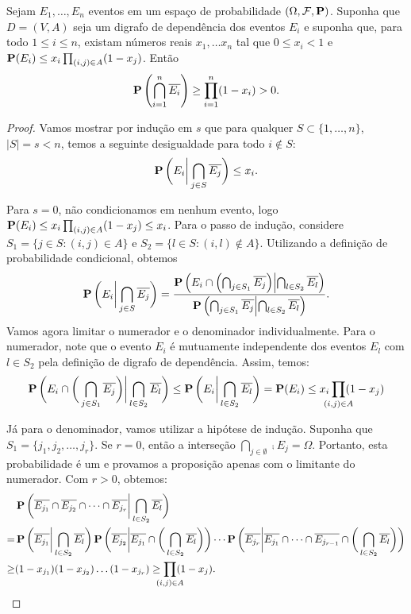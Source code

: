 \begin{lemma}
\label{thm:prob:lll}
Sejam $E_1, \dots, E_n$ eventos em um espaço de probabilidade $(\Omega, \mathcal{F}, \operatorname{\mathbf{P}})$. Suponha que $D = (V, A)$ seja um digrafo de dependência dos eventos $E_i$ e suponha que, para todo $1 \leq i \leq n$, existam números reais $x_1, \dotsc x_n$ tal que $0 \leq x_i < 1$ e $\operatorname{\mathbf{P}} (E_i) \leq x_i \prod_{(i,j) \in A}(1-x_j)$. Então
\[ \operatorname{\mathbf{P}} \left( \bigcap_{i = 1}^n \overline{E_i} \right) \geq \prod_{i = 1}^n (1 - x_i) > 0.\]
\end{lemma}
\begin{proof}
Vamos mostrar por indução em $s$ que para qualquer $S \subset \{1, \dots, n\}$, $|S| = s < n$, temos a seguinte desigualdade para todo $i \not\in S$:
\[ \operatorname{\mathbf{P}}\bigg( E_i \bigg| \bigcap_{j \in S} \overline{E_j} \bigg) \leq x_i.\]

Para $s = 0$, não condicionamos em nenhum evento, logo $\operatorname{\mathbf{P}}(E_i) \leq x_i \prod_{(i,j) \in A}(1-x_j) \leq x_i$. Para o passo de indução, considere $S_1 = \{ j \in S : (i,j) \in A\}$ e $S_2 = \{ l \in S : (i,l) \not\in A \}$. Utilizando a definição de probabilidade condicional, obtemos
\begin{align*}
  \operatorname{\mathbf{P}}\bigg( E_i \bigg| \bigcap_{j \in S} \overline{E_j} \bigg) = \frac{\operatorname{\mathbf{P}}\left( E_i \cap \left(\bigcap_{j \in S_1} \overline{E_j} \right) \middle| \bigcap_{l \in S_2} \overline{E_l} \right)}{\operatorname{\mathbf{P}}\left( \bigcap_{j \in S_1} \overline{E_j} \middle| \bigcap_{l \in S_2} \overline{E_l} \right)}.
\end{align*}
Vamos agora limitar o numerador e o denominador individualmente. Para o numerador, note que o evento $E_i$ é mutuamente independente dos eventos $E_l$ com $l \in S_2$ pela definição de digrafo de dependência. Assim, temos:
\[ \prob\bigg( E_i \cap \bigg(\bigcap_{j \in S_1} \comp{E_j} \bigg) \bigg| \bigcap_{l \in S_2} \comp{E_l} \bigg) \leq \prob\bigg( E_i \bigg| \bigcap_{l \in S_2} \comp{E_l} \bigg) = \prob(E_i) \leq x_i \prod_{\mathclap{(i,j) \in A}}(1-x_j) \]

Já para o denominador, vamos utilizar a hipótese de indução. Suponha que $S_1 = \{j_1, j_2, \dots, j_r \}$. Se $r = 0$, então a interseção $\bigcap_{j \in \emptyset} \comp{E_j}  = \Omega$. Portanto, esta probabilidade é um e provamos a proposição apenas com o limitante do numerador. Com $r > 0$, obtemos:
\begin{align*}
&\prob \bigg( \comp{E_{j_1}} \cap \comp{E_{j_2}} \cap \dots \cap \comp{E_{j_r}} \bigg| \bigcap_{l \in S_2} \comp{E_l} \bigg) \\
=&\prob \bigg( \comp{E_{j_1}} \bigg| \bigcap_{l \in S_2} \comp{E_l} \bigg) \prob \bigg( \comp{E_{j_2}} \bigg| \comp{E_{j_1}} \cap \bigg(\bigcap_{l \in S_2} \comp{E_l} \bigg) \bigg) \cdots \prob \bigg( \comp{E_{j_r}} \bigg| \comp{E_{j_1}} \cap \dots \cap \comp{E_{j_{r-1}}} \cap \bigg(\bigcap_{l \in S_2} \comp{E_l}\bigg) \bigg) \\
\geq&(1-x_{j_1})(1-x_{j_2})\dots(1-x_{j_r}) \geq \prod_{\mathclap{(i,j) \in A}}(1-x_j).
\end{align*}


\end{proof}
